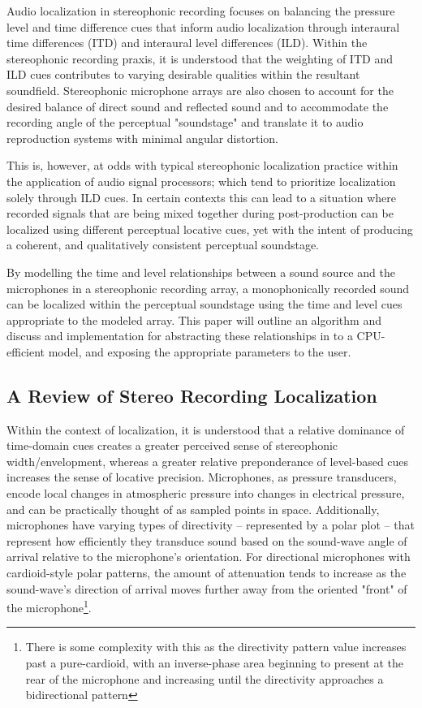 Audio localization in stereophonic recording focuses on balancing the pressure level and time difference cues that inform audio localization through interaural time differences (ITD) and interaural level differences (ILD). Within the stereophonic recording praxis, it is understood that the weighting of ITD and ILD cues contributes to varying desirable qualities within the resultant soundfield. Stereophonic microphone arrays are also chosen to account for the desired balance of direct sound and reflected sound and to accommodate the recording angle of the perceptual "soundstage" and translate it to audio reproduction systems with minimal angular distortion.

This is, however, at odds with typical stereophonic localization practice within the application of audio signal processors; which tend to prioritize localization solely through ILD cues. In certain contexts this can lead to a situation where recorded signals that are being mixed together during post-production can be localized using different perceptual locative cues, yet with the intent of producing a coherent, and qualitatively consistent perceptual soundstage.

By modelling the time and level relationships between a sound source and the microphones in a stereophonic recording array, a monophonically recorded sound can be localized within the perceptual soundstage using the time and level cues appropriate to the modeled array. This paper will outline an algorithm and discuss and implementation for abstracting these relationships in to a CPU-efficient model, and exposing the appropriate parameters to the user.

\subsection{A Review of Stereo Recording Localization}

Within the context of localization, it is understood that a relative dominance of time-domain cues creates a greater perceived sense of stereophonic width/envelopment, whereas a greater relative preponderance of level-based cues increases the sense of locative precision. Microphones, as pressure transducers, encode local changes in atmospheric pressure into changes in electrical pressure, and can be practically thought of as sampled points in space. Additionally, microphones have varying types of directivity -- represented by a polar plot -- that represent how efficiently they transduce sound based on the sound-wave angle of arrival relative to the microphone's orientation. For directional microphones with cardioid-style polar patterns, the amount of attenuation tends to increase as the sound-wave's direction of arrival moves further away from the oriented "front" of the microphone\footnote{There is some complexity with this as the directivity pattern value increases past a pure-cardioid, with an inverse-phase area beginning to present at the rear of the microphone and increasing until the directivity approaches a bidirectional pattern}.

